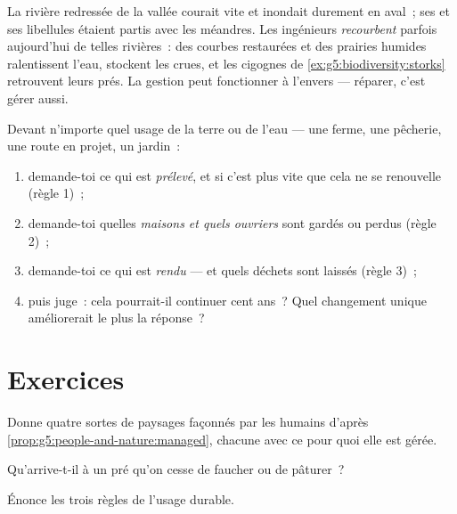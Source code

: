 \begin{example}\label{ex:g5:people-and-nature:river}
La rivière redressée de la vallée courait vite et inondait durement
en aval~; ses  et ses libellules étaient partis avec les
méandres. Les ingénieurs \emph{recourbent} parfois aujourd'hui de
telles rivières~: des courbes restaurées et des prairies humides
ralentissent l'eau, stockent les crues, et les cigognes de
\cref{ex:g5:biodiversity:storks} retrouvent leurs prés. La gestion
peut fonctionner à l'envers --- réparer, c'est gérer aussi.
\end{example}

\begin{method}\label{met:g5:people-and-nature:judge}
Devant n'importe quel usage de la terre ou de l'eau --- une ferme,
une pêcherie, une route en projet, un jardin~:
\begin{enumerate}
  \item demande-toi ce qui est \emph{prélevé}, et si c'est plus
        vite que cela ne se renouvelle (règle 1)~;
  \item demande-toi quelles \emph{maisons et quels ouvriers} sont
        gardés ou perdus (règle 2)~;
  \item demande-toi ce qui est \emph{rendu} --- et quels déchets
        sont laissés (règle 3)~;
  \item puis juge~: cela pourrait-il continuer cent ans~? Quel
        changement unique améliorerait le plus la réponse~?
\end{enumerate}
\end{method}

\section{Exercices}

\begin{exercise}[$\star$]\label{exo:g5:people-and-nature:1}
Donne quatre sortes de paysages façonnés par les humains d'après
\cref{prop:g5:people-and-nature:managed}, chacune avec ce pour quoi
elle est gérée.
\end{exercise}

\begin{exercise}[$\star$]\label{exo:g5:people-and-nature:2}
Qu'arrive-t-il à un pré qu'on cesse de faucher ou de pâturer~?
\end{exercise}

\begin{exercise}[$\star$]\label{exo:g5:people-and-nature:3}
Énonce les trois règles de l'usage durable.
\end{exercise}

